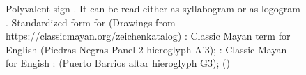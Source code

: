 \documentclass[../main.tex]{subfiles}
\begin{document}
\begin{figure}[ht]
{    }
    \caption[Polyvalent sign ]{Polyvalent sign .
            It can be read either as syllabogram  or as logogram .
            Standardized form for 
            (Drawings from https://classicmayan.org/zeichenkatalog)
            :
            Classic Mayan term  for English 
            (Piedras Negras Panel 2 hieroglyph A'3);
            :
            Classic Mayan  for 
            Engish : 
            (Puerto Barrios altar hieroglyph G3); (\authordrawings)}
\end{figure}
\end{document}
